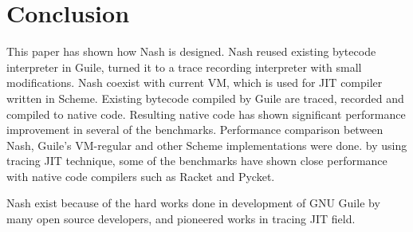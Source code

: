 \documentclass[preprint]{sigplanconf}
\begin{document}
\section{Conclusion}
\label{sec:conclusion}
This paper has shown how Nash is designed. Nash reused existing bytecode
interpreter in Guile, turned it to a trace recording interpreter with small
modifications. Nash coexist with current VM, which is used for JIT compiler
written in Scheme. Existing bytecode compiled by Guile are traced, recorded
and compiled to native code. Resulting native code has shown significant
performance improvement in several of the benchmarks.  Performance comparison
between Nash, Guile's VM-regular and other Scheme implementations were
done. by using tracing JIT technique, some of the benchmarks have shown
close performance with native code compilers such as Racket and Pycket.


\acks{} Nash exist because of the hard works done in development of GNU Guile
by many open source developers, and pioneered works in tracing JIT field.







\end{document}
